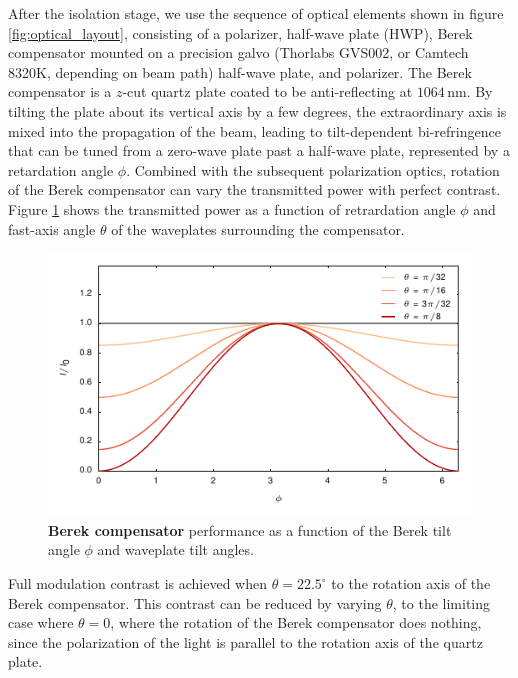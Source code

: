 \documentclass[twocolumn,aps,pra,showpacs,preprintnumbers,bibnotes]{revtex4-1}
\begin{document}
After the isolation stage, we use the sequence of optical elements shown in figure \ref{fig:optical_layout}, consisting of a polarizer, half-wave plate (HWP), Berek compensator mounted on a precision galvo (Thorlabs GVS002, or Camtech 8320K, depending on beam path) half-wave plate, and polarizer. 
The Berek compensator is a $z$-cut quartz plate coated to be anti-reflecting at $1064\,$nm. 
By tilting the plate about its vertical axis by a few degrees, the extraordinary axis is mixed into the propagation of the beam, leading to  tilt-dependent bi-refringence that can be tuned from a zero-wave plate past a half-wave plate, represented by a retardation angle $\phi$.
Combined with the subsequent polarization optics, rotation of the Berek compensator can vary the transmitted power with perfect contrast. 
Figure \ref{fig:berek} shows the transmitted power as a function of retrardation angle $\phi$ and fast-axis angle $\theta$ of the waveplates surrounding the compensator.
\begin{figure}
  \begin{center}
    \includegraphics{fig/berek_sim.pdf}
    \caption{\textbf{Berek compensator} performance as a function of the Berek tilt angle $\phi$ and waveplate tilt angles.}\label{fig:berek}
  \end{center}
\end{figure}

Full modulation contrast is achieved when $\theta=22.5^\circ$ to the rotation axis of the Berek compensator.
This contrast can be reduced by varying $\theta$, to the limiting case where $\theta=0$, where the rotation of the Berek compensator does nothing, since the polarization of the light is parallel to the rotation axis of the quartz plate.
\end{document}
